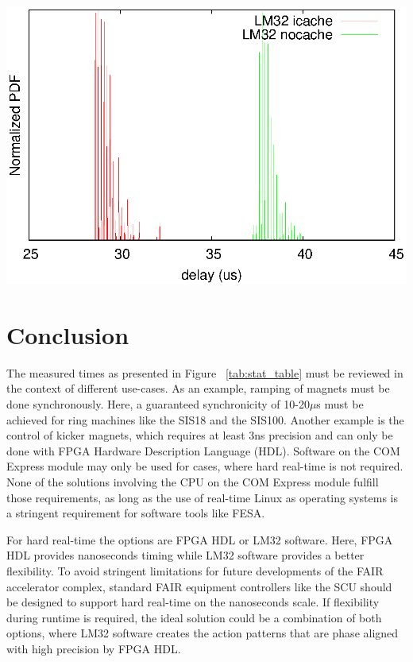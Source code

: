 \documentclass[25pt,halfparskip-,pagesize]{scrartcl}
\begin{document}
\begin{multicols*}{3}
\includegraphics[width=\columnwidth]{../images/lm32plot}
\label{fig:lm32plot}

\section{Conclusion}
The measured times as presented in Figure ~\ref{tab:stat_table}
must be reviewed in the context of different use-cases. As an example,
ramping of magnets must be done synchronously. Here, a guaranteed
synchronicity of 10-20$\mu$s must be achieved for ring machines like the
SIS18 and the SIS100. Another example is the control of kicker magnets,
which requires  at least 3ns precision and can only be done with FPGA
Hardware Description Language (HDL). Software on the COM Express module
may only be used for cases, where hard real-time is not required.
None of the solutions involving the CPU on the COM Express module fulfill
those requirements, as long as the use of real-time Linux as operating
systems is a stringent requirement for software tools like FESA.

For hard real-time the options are FPGA HDL or LM32 software. Here, FPGA
HDL provides nanoseconds timing while LM32 software provides a better
flexibility. To avoid stringent limitations for future developments of
the FAIR accelerator complex, standard FAIR equipment controllers like
the SCU should be designed to support hard real-time on the nanoseconds
scale. If flexibility during runtime is required, the ideal solution
could be a combination of both options, where LM32 software creates the
action patterns that are phase aligned with high precision by FPGA HDL.


\vfill

\end{multicols*}
\end{document}
